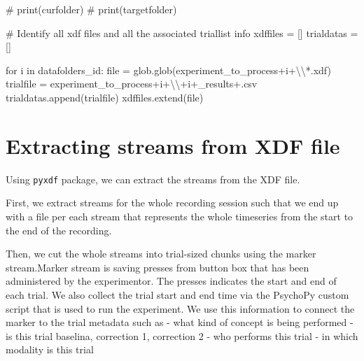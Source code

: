 \documentclass[
  letterpaper,
  DIV=11,
  numbers=noendperiod]{scrreprt}
\newenvironment{Shaded}{\begin{snugshade}}{\end{snugshade}}
\newcommand{\BuiltInTok}[1]{\textcolor[rgb]{0.00,0.23,0.31}{#1}}
\newcommand{\CharTok}[1]{\textcolor[rgb]{0.13,0.47,0.30}{#1}}
\newcommand{\CommentTok}[1]{\textcolor[rgb]{0.37,0.37,0.37}{#1}}
\newcommand{\ControlFlowTok}[1]{\textcolor[rgb]{0.00,0.23,0.31}{#1}}
\newcommand{\KeywordTok}[1]{\textcolor[rgb]{0.00,0.23,0.31}{#1}}
\newcommand{\NormalTok}[1]{\textcolor[rgb]{0.00,0.23,0.31}{#1}}
\newcommand{\OperatorTok}[1]{\textcolor[rgb]{0.37,0.37,0.37}{#1}}
\newcommand{\StringTok}[1]{\textcolor[rgb]{0.13,0.47,0.30}{#1}}
\begin{document}
\begin{Shaded}
\begin{Highlighting}[]
\CommentTok{\# print(curfolder)}
\CommentTok{\# print(targetfolder)}


\CommentTok{\# Identify all xdf files and all the associated triallist info}
\NormalTok{xdffiles }\OperatorTok{=}\NormalTok{ []}
\NormalTok{trialdatas }\OperatorTok{=}\NormalTok{ []}

\ControlFlowTok{for}\NormalTok{ i }\KeywordTok{in}\NormalTok{ datafolders\_id:}
    \BuiltInTok{file} \OperatorTok{=}\NormalTok{ glob.glob(experiment\_to\_process}\OperatorTok{+}\NormalTok{i}\OperatorTok{+}\StringTok{\textquotesingle{}}\CharTok{\textbackslash{}\textbackslash{}}\StringTok{*.xdf\textquotesingle{}}\NormalTok{)}
\NormalTok{    trialfile }\OperatorTok{=}\NormalTok{ experiment\_to\_process}\OperatorTok{+}\NormalTok{i}\OperatorTok{+}\StringTok{\textquotesingle{}}\CharTok{\textbackslash{}\textbackslash{}}\StringTok{\textquotesingle{}}\OperatorTok{+}\NormalTok{i}\OperatorTok{+}\StringTok{\textquotesingle{}\_results\textquotesingle{}}\OperatorTok{+}\StringTok{\textquotesingle{}.csv\textquotesingle{}}
\NormalTok{    trialdatas.append(trialfile)}
\NormalTok{    xdffiles.extend(}\BuiltInTok{file}\NormalTok{)}
\end{Highlighting}
\end{Shaded}


\chapter{Extracting streams from XDF
file}\label{extracting-streams-from-xdf-file}

Using \texttt{pyxdf} package, we can extract the streams from the XDF
file.

First, we extract streams for the whole recording session such that we
end up with a file per each stream that represents the whole timeseries
from the start to the end of the recording.

Then, we cut the whole streams into trial-sized chunks using the marker
stream.Marker stream is saving presses from button box that has been
administered by the experimentor. The presses indicates the start and
end of each trial. We also collect the trial start and end time via the
PsychoPy custom script that is used to run the experiment. We use this
information to connect the marker to the trial metadata such as - what
kind of concept is being performed - is this trial baselina, correction
1, correction 2 - who performs this trial - in which modality is this
trial
\end{document}
